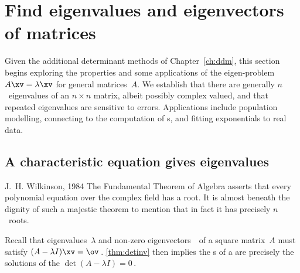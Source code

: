 

\section{Find eigenvalues and eigenvectors of matrices}
\label{sec:eennm}
\secttoc

Given the additional determinant methods of Chapter~\ref{ch:ddm}, this section begins exploring the properties and some applications of the eigen-problem \(A\xv=\lambda\xv\) for general matrices~\(A\).
We establish that there are generally \(n\)~eigenvalues of an \(n\times n\) matrix, albeit possibly complex valued, and that repeated eigenvalues are sensitive to errors.
Applications include population modelling, connecting to the computation of \svd{}s, and fitting exponentials to real data.




\subsection{A characteristic equation gives eigenvalues}
\label{sec:cege}

\begin{quoted}{J.~H. Wilkinson, 1984 \cite[p.103]{Higham1996}}
The Fundamental Theorem of Algebra asserts that every polynomial equation over the complex field has a root.  
It is almost beneath the dignity of such a majestic theorem to mention that in fact it has precisely \(n\)~roots.
\end{quoted}


Recall that eigenvalues~\(\lambda\) and non-zero eigenvectors~\xv\ of a square matrix~\(A\) must satisfy \((A-\lambda I)\xv=\ov\)\,.
\autoref{thm:detinv} then implies the s of a  are precisely the solutions of the  \(\det(A-\lambda I)=0\)\,.  


